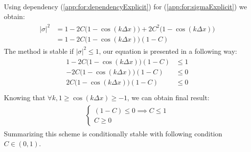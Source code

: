 	Using dependency (\ref{app:for:dependencyExplicit}) for (\ref{app:for:sigmaExplicit}) we obtain:	
	\begin{align}
		\begin{split}
			|\sigma|^2 &= 1 - 2C\Big(1-\cos(k\Delta x)\Big) + 2C^2\Big(1 - \cos(k\Delta x)\Big) \\
			&= 1-2C\Big(1-\cos(k\Delta x)\Big)(1-C)
		\end{split}
	\end{align} 	
	The method is stable if $|\sigma|^2 \leq 1$, our equation is presented in a following way:	
	\begin{align}
		\begin{split}
			1-2C\Big(1-\cos(k\Delta x)\Big)(1-C) &\leq 1 \\
			-2C\Big(1-\cos(k\Delta x)\Big)(1-C) &\leq 0 \\
			2C\Big(1-\cos(k\Delta x)\Big)(1-C) &\leq0 \\
		\end{split}
	\end{align} 	
	Knowing that $ \forall k,  1 \geq \cos(k\Delta x) \geq -1$, we can obtain final result:	
	\begin{align}
		\begin{split}
			\begin{cases}
				(1-C) \leq 0 \implies C \leq 1 \\
				C \geq 0
			\end{cases}
		\end{split}
	\end{align} 	
	Summarizing this scheme is conditionally stable with following condition $C \in \left(0, 1\right)$.
	
	
	